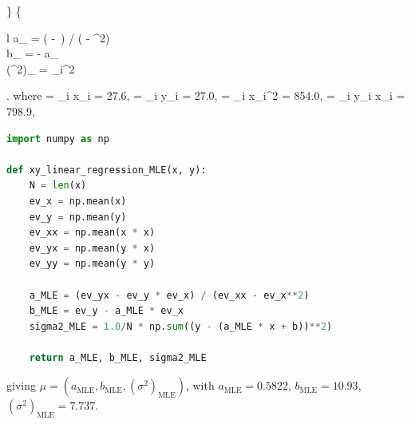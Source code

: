 \begin{itemize}
			\right\}
			\Rightarrow
			\left\{
				\begin{array}{l}
				a_ = \big( - \,\big) / \big( - ^2\big)
				\\
				b_ =  - a_\,
				\\
				(\sigma^2)_ = \sum_i^2
				\end{array}
			\right.
		\ee
		where
		\be
			 = \sum_i x_i = 27.6,\qquad 
			 = \sum_i y_i = 27.0,\qquad
			 = \sum_i x_i^2 = 854.0,\qquad
			 = \sum_i y_i x_i = 798.9,\qquad
		\ee
\begin{lstlisting}[language=python]
import numpy as np

def xy_linear_regression_MLE(x, y):
    N = len(x)
    ev_x = np.mean(x)
    ev_y = np.mean(y)
    ev_xx = np.mean(x * x)
    ev_yx = np.mean(y * x)
    ev_yy = np.mean(y * y)

    a_MLE = (ev_yx - ev_y * ev_x) / (ev_xx - ev_x**2)
    b_MLE = ev_y - a_MLE * ev_x
    sigma2_MLE = 1.0/N * np.sum((y - (a_MLE * x + b))**2)
    
    return a_MLE, b_MLE, sigma2_MLE
\end{lstlisting}
		giving $\mu = (a_\text{MLE}, b_\text{MLE}, (\sigma^2)_\text{MLE})$, with $a_\text{MLE} = 0.5822$, \quad $b_\text{MLE} = 10.93$, \quad  $(\sigma^2)_\text{MLE} = 7.737$.


\end{itemize}
